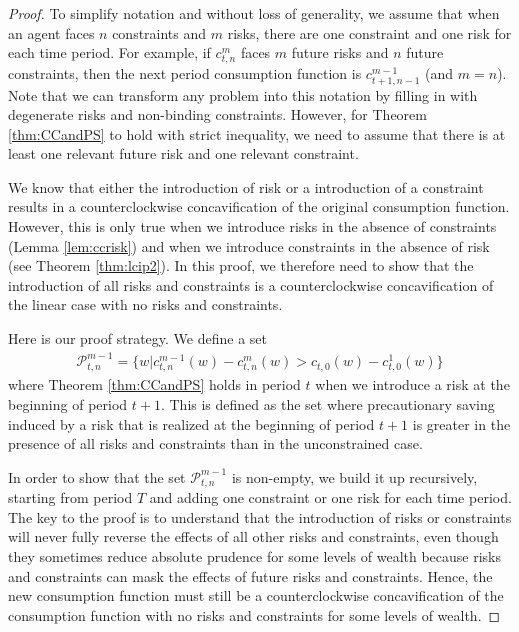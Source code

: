 \documentclass[titlepage]{\econtex}
\begin{document}
  \begin{proof}
    To simplify notation and without loss of generality, we assume that when an agent faces $n$ constraints and $m$ risks, there are one constraint and one risk for each time period. For example, if $c_{t,n}^{m}$ faces $m$ future risks and $n$ future constraints, then the next period consumption function is $c_{t+1,n-1}^{m-1}$ (and $m = n$). Note that we can transform any problem into this notation by filling in with degenerate risks and non-binding constraints. However, for Theorem \ref{thm:CCandPS} to hold with strict inequality, we need to assume that there is at least one relevant future risk and one relevant constraint. 
    
    We know that either the introduction of risk or a introduction of a constraint results in a counterclockwise concavification of the original consumption function. However, this is only true when we introduce risks in the absence of constraints (Lemma \ref{lem:ccrisk}) and when we introduce constraints in the absence of risk (see Theorem \ref{thm:lcip2}). In this proof, we therefore need to show that the introduction of all risks and constraints is a counterclockwise concavification of the linear case with no risks and constraints.
    
    Here is our proof strategy. We define a set 
    \begin{align}
      \mathcal{P}_{t,n}^{m-1} = \{ w | c_{t,n}^{m-1}(w)-c_{t,n}^{m}(w)>c_{t,0}(w)-c^{1}_{t,0}(w) \} \label{eq:whatcanbesaid_proof}
    \end{align}
    where Theorem \ref{thm:CCandPS} holds in period $t$ when we introduce a risk at the beginning of period $t+1$. This is defined as the set where precautionary saving induced by a risk that is realized at the beginning of period $t+1$ is greater in the presence of all risks and constraints than in the unconstrained case.
    
    In order to show that the set $\mathcal{P}_{t,n}^{m-1}$ is non-empty, we build it up recursively, starting from period $T$ and adding one constraint or one risk  for each time period. The key to the proof is to understand that the introduction of risks or constraints will never fully reverse the effects of all other risks and constraints, even though they sometimes reduce absolute prudence for some levels of wealth because risks and constraints can mask the effects of future risks and constraints. Hence, the new consumption function must still be a counterclockwise concavification of the consumption function with no risks and constraints for some levels of wealth. 
    

\end{proof}
\end{document}
